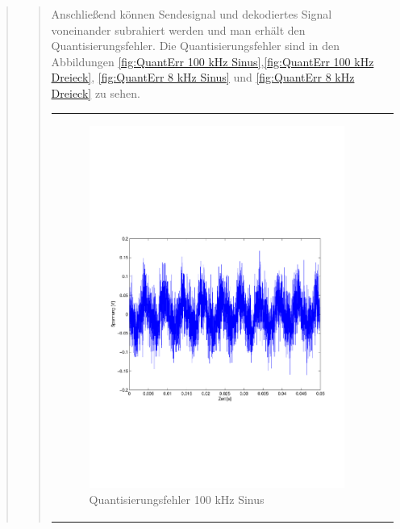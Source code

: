\begin{quote}
\begin{quote}
        
        
        Anschließend können Sendesignal und dekodiertes Signal voneinander subrahiert werden und man erhält den
        Quantisierungsfehler. Die Quantisierungsfehler sind in den Abbildungen \ref{fig:QuantErr 100 kHz
        Sinus},\ref{fig:QuantErr 100 kHz Dreieck}, \ref{fig:QuantErr 8 kHz Sinus} und \ref{fig:QuantErr 8 kHz
        Dreieck} zu sehen.\\
        
        \begin{center}
            \begin{tabular}{ll}
            
            \hspace{-4cm}
                \begin{minipage}{0.6\textwidth}
                    \begin{figure}[H]
                        \includegraphics[scale=0.5, trim = 16mm 70mm 16mm 85mm, clip]
                                        {Bilder/100kHz_sin_Quantisierungsfehler}
                          \caption{Quantisierungsfehler 100 kHz Sinus}
                          \label{fig:QuantErr 100 kHz Sinus}
                    \end{figure}
                \end{minipage}
                

\end{tabular}
\end{center}
\end{quote}
\end{quote}
